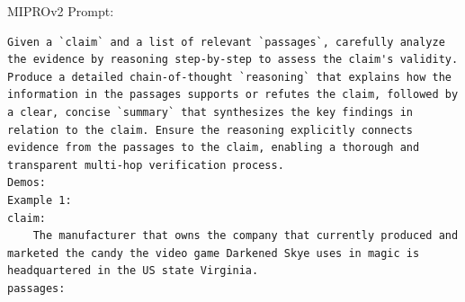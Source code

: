 \begin{instructbox}
MIPROv2 Prompt:
\begin{lstlisting}[breakindent=0pt, breaklines=true, breakatwhitespace=true, frame=single, backgroundcolor=\color{green!10}]
Given a `claim` and a list of relevant `passages`, carefully analyze the evidence by reasoning step-by-step to assess the claim's validity. Produce a detailed chain-of-thought `reasoning` that explains how the information in the passages supports or refutes the claim, followed by a clear, concise `summary` that synthesizes the key findings in relation to the claim. Ensure the reasoning explicitly connects evidence from the passages to the claim, enabling a thorough and transparent multi-hop verification process.
Demos:
Example 1:
claim:
    The manufacturer that owns the company that currently produced and marketed the candy the video game Darkened Skye uses in magic is headquartered in the US state Virginia.
passages:

\end{lstlisting}
\end{instructbox}
